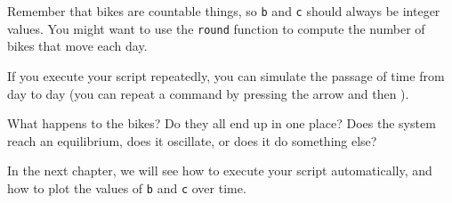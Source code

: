 Remember that bikes are countable things, so \lstinline{b} and \lstinline{c} should always be integer values.  You might want to use the \lstinline{round} function
to compute the number of bikes that move each day.

If you execute your script repeatedly, you can simulate the passage
of time from day to day (you can repeat a command by pressing the  arrow and then ).

What happens to the bikes?  Do they all end up in one place?  Does the system reach an equilibrium, does it oscillate, or does it do something else?

In the next chapter, we will see how to execute your script automatically,
and how to plot the values of \lstinline{b} and \lstinline{c} over time.


